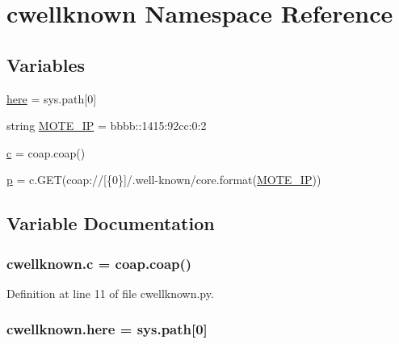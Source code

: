 \hypertarget{namespacecwellknown}{}\section{cwellknown Namespace Reference}
\label{namespacecwellknown}
\subsection*{Variables}
\begin{DoxyCompactItemize}
\item 
\hyperlink{namespacecwellknown_adce4b46fe884589bffb23cd3878b30b1}{here} = sys.\+path\mbox{[}0\mbox{]}
\item 
string \hyperlink{namespacecwellknown_a09d0560483e11548bf674f44f901f86e}{M\+O\+T\+E\+\_\+\+IP} = \textquotesingle{}bbbb\+::1415\+:92cc\+:0\+:2\textquotesingle{}
\item 
\hyperlink{namespacecwellknown_a4141e646c4cc1bf3f31e3b87d0a27279}{c} = coap.\+coap()
\item 
\hyperlink{namespacecwellknown_ae44f08bf9d6b6a4fbc6289c2a6e9138d}{p} = c.\+G\+ET(\textquotesingle{}coap\+://\mbox{[}\{0\}\mbox{]}/.well-\/known/core\textquotesingle{}.format(\hyperlink{namespacecwellknown_a09d0560483e11548bf674f44f901f86e}{M\+O\+T\+E\+\_\+\+IP}))
\end{DoxyCompactItemize}


\subsection{Variable Documentation}
\subsubsection[{\texorpdfstring{c}{c}}]{\setlength{\rightskip}{0pt plus 5cm}cwellknown.\+c = coap.\+coap()}\hypertarget{namespacecwellknown_a4141e646c4cc1bf3f31e3b87d0a27279}{}\label{namespacecwellknown_a4141e646c4cc1bf3f31e3b87d0a27279}


Definition at line 11 of file cwellknown.\+py.

\subsubsection[{\texorpdfstring{here}{here}}]{\setlength{\rightskip}{0pt plus 5cm}cwellknown.\+here = sys.\+path\mbox{[}0\mbox{]}}\hypertarget{namespacecwellknown_adce4b46fe884589bffb23cd3878b30b1}{}\label{namespacecwellknown_adce4b46fe884589bffb23cd3878b30b1}


